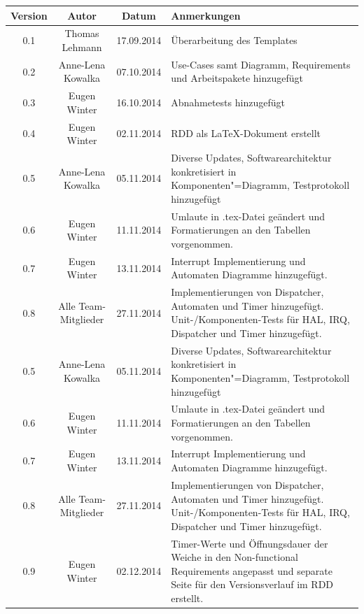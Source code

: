 \documentclass[oneside,a4paper,titlepage]{scrartcl}              %
\begin{document}
\begin{small}
  \begin{center}
    \begin{tabular}{|c|c|c|p{7.25cm}|}
      \hline
      \rowcolor{lightgray}\textbf{Version} & \textbf{Autor} & \textbf{Datum} & \textbf{Anmerkungen}\\
      \hline
      0.1 & Thomas Lehmann & 17.09.2014 & Überarbeitung des Templates\\
      \hline
      0.2 & Anne-Lena Kowalka & 07.10.2014 & Use-Cases samt Diagramm, Requirements und Arbeitspakete hinzugefügt\\
      \hline
      0.3 & Eugen Winter & 16.10.2014 & Abnahmetests hinzugefügt\\
      \hline
      0.4 & Eugen Winter & 02.11.2014 & RDD als \LaTeX -Dokument erstellt\\
      \hline
      0.5 & Anne-Lena Kowalka & 05.11.2014 & Diverse Updates, Softwarearchitektur konkretisiert in Komponenten"=Diagramm, Testprotokoll hinzugefügt \\
      \hline
      0.6 & Eugen Winter & 11.11.2014 & Umlaute in .tex-Datei geändert und Formatierungen an den Tabellen vorgenommen.\\
      \hline
      0.7 & Eugen Winter & 13.11.2014 & Interrupt Implementierung und Automaten Diagramme hinzugefügt.\\
      \hline
      0.8 & Alle Team-Mitglieder & 27.11.2014 & Implementierungen von Dispatcher, Automaten und Timer hinzugefügt. Unit-/Komponenten-Tests für HAL, IRQ, Dispatcher und Timer hinzugefügt.\\
      \hline
      0.5 & Anne-Lena Kowalka & 05.11.2014 & Diverse Updates, Softwarearchitektur konkretisiert in Komponenten"=Diagramm, Testprotokoll hinzugefügt \\
      \hline
      0.6 & Eugen Winter & 11.11.2014 & Umlaute in .tex-Datei geändert und Formatierungen an den Tabellen vorgenommen.\\
      \hline
      0.7 & Eugen Winter & 13.11.2014 & Interrupt Implementierung und Automaten Diagramme hinzugefügt.\\
      \hline
      0.8 & Alle Team-Mitglieder & 27.11.2014 & Implementierungen von Dispatcher, Automaten und Timer hinzugefügt. Unit-/Komponenten-Tests für HAL, IRQ, Dispatcher und Timer hinzugefügt.\\
      \hline
      0.9 & Eugen Winter & 02.12.2014 & Timer-Werte und Öffnungsdauer der Weiche in den Non-functional Requirements angepasst und separate Seite für den Versionsverlauf im RDD erstellt.\\

\end{tabular}
\end{center}
\end{small}
\end{document}
